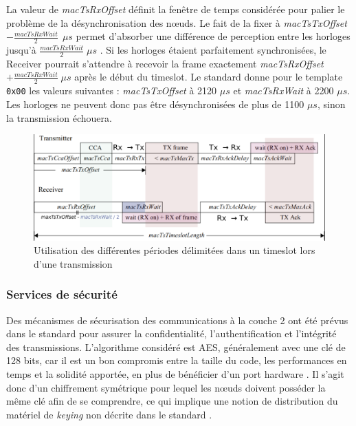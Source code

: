 \documentclass[]{report}
\begin{document}
\vspace{0.4cm}	
	
\par La valeur de \textit{macTsRxOffset} définit la fenêtre de temps considérée pour palier le problème de la désynchronisation des nœuds. Le fait de la fixer à \textit{macTsTxOffset} $- \frac{macTsRxWait}{2} \: \: \mu s$ permet d'absorber une différence de perception entre les horloges jusqu'à $\frac{macTsRxWait}{2} \;\mu s$ \cite{ATP}. Si les horloges étaient parfaitement synchronisées, le Receiver pourrait s'attendre à recevoir la frame exactement \textit{macTsRxOffset} $+ \frac{macTsRxWait}{2} \; \mu s$ après le début du timeslot. Le standard \cite{IEEE802.15.4} donne pour le template \texttt{0x00} les valeurs suivantes : \textit{macTsTxOffset} à 2120 $\mu s$ et \textit{macTsRxWait} à 2200 $\mu s$. Les horloges ne peuvent donc pas être désynchronisées de plus de 1100 $\mu s$, sinon la transmission échouera.

\vspace{0.4cm}

	\begin{figure}[!ht]
	\centering
	\includegraphics[width=\linewidth]{timeslot}
	\caption{Utilisation des différentes périodes délimitées dans un timeslot lors d'une transmission}
	\label{fig:timeslot}
	\end{figure}

\subsubsection{Services de sécurité}
\label{IEEE802.15.4-sec}

Des mécanismes de sécurisation des communications à la couche 2 ont été prévus dans le standard pour assurer la confidentialité, l'authentification et l'intégrité des transmissions. L'algorithme considéré est AES, généralement avec une clé de 128 bits, car il est un bon compromis entre la taille du code, les performances en temps et la solidité apportée, en plus de bénéficier d'un port hardware \cite{link-layer-sec-impact}. Il s'agit donc d'un chiffrement symétrique pour lequel les nœuds doivent posséder la même clé afin de se comprendre, ce qui implique une notion de distribution du matériel de \textit{keying} non décrite dans le standard \cite{IEEE802.15.4}.\\
\end{document}
